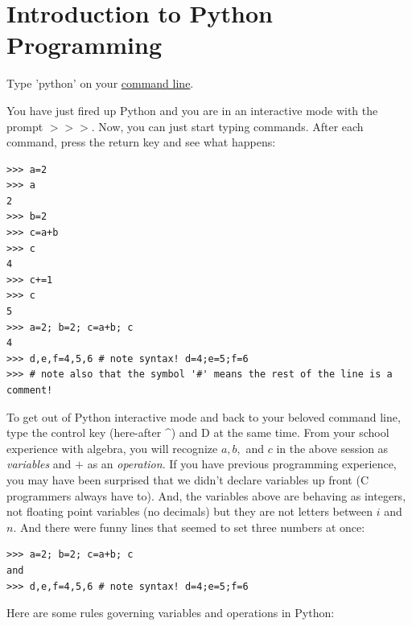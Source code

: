 \documentclass[11pt]{book}
\begin{document}
{{{

\chapter{Introduction to Python Programming}
\label{chap:python}

Type 'python' on your \href{#command_line}{command line}.

You have just fired up Python and  you are in an interactive mode with the prompt  {\color{blue}$>>>$}.  Now, you can just start typing commands. After each command, press the return key and see what happens:

{ \color{blue} \begin{verbatim}
>>> a=2
>>> a
2
>>> b=2
>>> c=a+b
>>> c
4
>>> c+=1
>>> c
5
>>> a=2; b=2; c=a+b; c
4
>>> d,e,f=4,5,6 # note syntax! d=4;e=5;f=6
>>> # note also that the symbol '#' means the rest of the line is a comment!
\end{verbatim}}

To get out of Python interactive mode and back to your beloved command line, type the control key (here-after  {\color{blue}\^{ }}) and  {\color{blue}D} at the same time.
From your  school experience with algebra, you will recognize $a, b,$ and $c$ in the above session as {\it variables} and $+$ as an {\it operation}. If you have previous programming experience, you may have been surprised that we didn't declare variables up front (C programmers always have to).  And, the variables above are behaving as integers, not floating point variables (no decimals) but they are not letters between $i$ and $n$.  And there were funny lines that seemed to set three numbers at once:

{ \color{blue} \begin{verbatim}
>>> a=2; b=2; c=a+b; c
and
>>> d,e,f=4,5,6 # note syntax! d=4;e=5;f=6
\end{verbatim}}
\noindent
Here are some rules governing variables and operations in Python:


}}}
\end{document}
